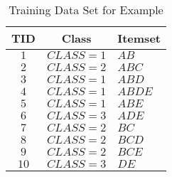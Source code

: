 \begin{table}[htbp]
	\centering
		\begin{tabular}{|c|c|l|}
		\hline
		\textbf{TID}	& \textbf{Class}	& \textbf{Itemset}	\\
		\hline
		$1$		& $CLASS=1$		& $AB$			\\
		\hline
		$2$		& $CLASS=2$		& $ABC$			\\
		\hline
		$3$		& $CLASS=1$		& $ABD$			\\
		\hline
		$4$		& $CLASS=1$		& $ABDE$		\\
		\hline
		$5$		& $CLASS=1$		& $ABE$			\\
		\hline
		$6$		& $CLASS=3$		& $ADE$			\\
		\hline
		$7$		& $CLASS=2$		& $BC$			\\
		\hline
		$8$		& $CLASS=2$		& $BCD$			\\
		\hline
		$9$		& $CLASS=2$		& $BCE$			\\
		\hline
		$10$		& $CLASS=3$		& $DE$			\\
		\hline
		\end{tabular}
	\caption{Training Data Set for Example}
	\label{tab:example_training_db}
\end{table}